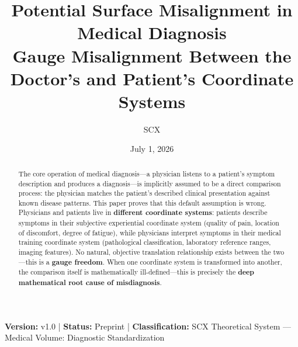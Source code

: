 \documentclass[12pt,a4paper]{article}
\title{\textbf{Potential Surface Misalignment in Medical Diagnosis}\\[4pt]
\large Gauge Misalignment Between the Doctor's and Patient's Coordinate Systems}
\author{SCX}
\date{July 1, 2026}
\theoremstyle{remark}
\begin{document}
\maketitle

\begin{center}
\footnotesize
\textbf{Version:} v1.0 \quad | \quad
\textbf{Status:} Preprint \quad | \quad
\textbf{Classification:} SCX Theoretical System --- Medical Volume: Diagnostic Standardization
\end{center}


\begin{abstract}

The core operation of medical diagnosis---a physician listens to a patient's symptom description and produces a diagnosis---is implicitly assumed to be a direct comparison process: the physician matches the patient's described clinical presentation against known disease patterns. This paper proves that this default assumption is wrong. Physicians and patients live in \textbf{different coordinate systems}: patients describe symptoms in their subjective experiential coordinate system (quality of pain, location of discomfort, degree of fatigue), while physicians interpret symptoms in their medical training coordinate system (pathological classification, laboratory reference ranges, imaging features). No natural, objective translation relationship exists between the two---this is a \textbf{gauge freedom}. When one coordinate system is transformed into another, the comparison itself is mathematically ill-defined---this is precisely the \textbf{deep mathematical root cause of misdiagnosis}.


\end{abstract}
\end{document}
